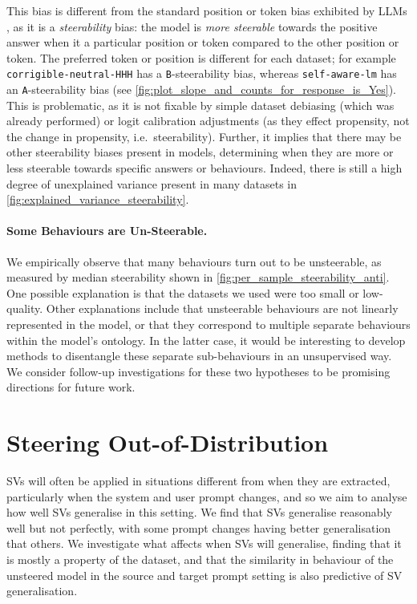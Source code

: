 \documentclass{article}
\begin{document}
This bias is different from the standard position or token bias exhibited by LLMs \citep{zhengJudgingLLMasaJudgeMTBench2023, wangLargeLanguageModels2023}, as it is a \emph{steerability} bias: the model is \emph{more steerable} towards the positive answer when it a particular position or token compared to the other position or token. The preferred token or position is different for each dataset; for example \texttt{corrigible-neutral-HHH} has a \texttt{B}-steerability bias, whereas \texttt{self-aware-lm} has an \texttt{A}-steerability bias (see \cref{fig:plot_slope_and_counts_for_response_is_Yes}). This is problematic, as it is not fixable by simple dataset debiasing (which was already performed) or logit calibration adjustments \cite{zhouBatchCalibrationRethinking2024} (as they effect propensity, not the change in propensity, i.e.~steerability). Further, it implies that there may be other steerability biases present in models, determining when they are more or less steerable towards specific answers or behaviours. Indeed, there is still a high degree of unexplained variance present in many datasets in \cref{fig:explained_variance_steerability}.

\paragraph{Some Behaviours are Un-Steerable.}
We empirically observe that many behaviours turn out to be unsteerable, as measured by median steerability shown in \cref{fig:per_sample_steerability_anti}. One possible explanation is that the datasets we used were too small or low-quality. Other explanations include that unsteerable behaviours are not linearly represented in the model, or that they correspond to multiple separate behaviours within the model's ontology. In the latter case, it would be interesting to develop methods to disentangle these separate sub-behaviours in an unsupervised way. We consider follow-up investigations for these two hypotheses to be promising directions for future work. 

\section{Steering Out-of-Distribution}\label{sec:ood_gen}
SVs will often be applied in situations different from when they are extracted, particularly when the system and user prompt changes, and so we aim to analyse how well SVs generalise in this setting. We find that SVs  generalise reasonably well but not perfectly, with some prompt changes having better generalisation that others. We investigate what affects when SVs will generalise, finding that it is mostly a property of the dataset, and that the similarity in behaviour of the unsteered model in the source and target prompt setting is also predictive of SV generalisation.
\end{document}
